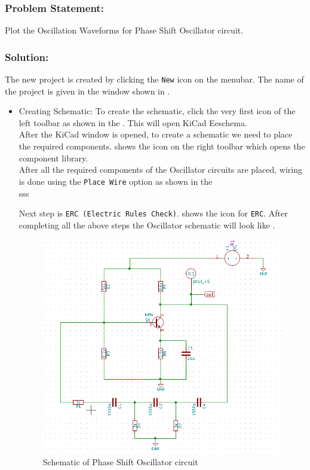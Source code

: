 \subsubsection{Problem Statement:} Plot the Oscillation Waveforms for Phase Shift Oscillator circuit.

\subsubsection{Solution:}
The new project is created by clicking the {\tt New} icon on the menubar. The name of the project is given in the window shown in .

\begin{itemize}
\item Creating Schematic:
To create the schematic, click the very first icon of the left toolbar as shown in the . This will open KiCad Eeschema.\\

After the KiCad window is opened, to create a schematic we need to place the required components.  shows the icon on the 
right toolbar which opens the component library.\\

After all the required components of the Oscillator circuits are placed, wiring is done using the {\tt Place Wire} option as shown in the \\sss

Next step is {\tt ERC (Electric Rules Check)}.  shows the icon for {\tt ERC}. After completing all the above steps the Oscillator schematic will look like .\\

\begin{figure}[!htp]
    \centering
    \includegraphics[width=\lgfig]{figures/osc_schematic.png}
    \caption{Schematic of Phase Shift Oscillator circuit}
    \label{osc_schematic}
\end{figure}


\end{itemize}
